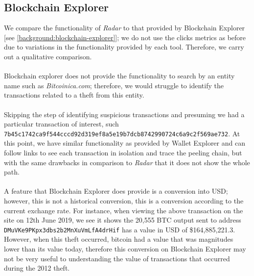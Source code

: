 \subsection{Blockchain Explorer}
We compare the functionality of \textit{Radar} to that provided by Blockchain Explorer [see \ref{background:blockchain-explorer}]; we do not use the clicks metrics as before due to variations in the functionality provided by each tool. Therefore, we carry out a qualitative comparison.
\\\\
Blockchain explorer does not provide the functionality to search by an entity name such as \textit{Bitcoinica.com}; therefore, we would struggle to identify the transactions related to a theft from this entity. 
\\\\
Skipping the step of identifying suspicious transactions and presuming we had a particular transaction of interest, such \texttt{7b45c1742ca9f544cccd92d319ef8a5e19b7dcb8742990724c6a9c2f569ae732}. At this point, we have similar functionality as provided by Wallet Explorer and can follow links to see each transaction in isolation and trace the peeling chain, but with the same drawbacks in comparison to \textit{Radar} that it does not show the whole path. 
\\\\
A feature that Blockchain Explorer does provide is a conversion into USD; however, this is not a historical conversion, this is a conversion according to the current exchange rate. For instance, when viewing the above transaction on the site on 12th June 2019, we see it shows the 20,555 BTC output sent to address \texttt{DMuVKe9PKpx3dbs2b2MnXuVmLfA4drHif} has a value in USD of \$164,885,221.3. However, when this theft occurred, bitcoin had a value that was magnitudes lower than its value today, therefore this conversion on Blockchain Explorer may not be very useful to understanding the value of transactions that occurred during the 2012 theft. 

